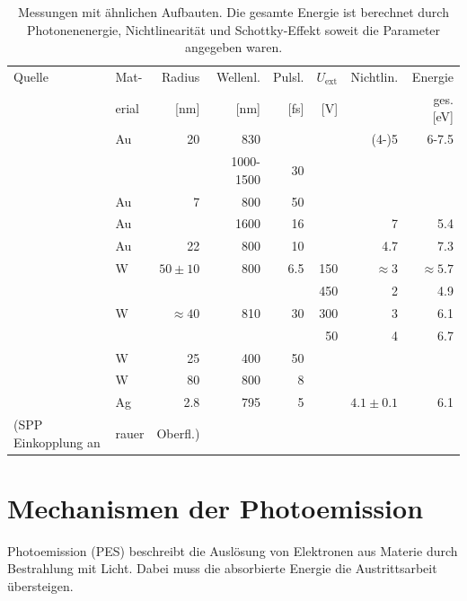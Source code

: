 \documentclass[bachelor,       %
               twoside,        %
               BCOR10mm,       %
               english,ngerman, %
               ]{GAUBM}
\begin{document}
\begin{table}[h]
	\centering
	\begin{tabular}{|l|l|r|r|r|r|r||r|}
\hline	Quelle 	& Mat- & Radius & Wellenl. & Pulsl. & $U_\text{ext}$ & Nichtlin. & Energie\\
& erial & [nm] & [nm] & [fs] & [V] & & ges. [eV]\\\hline\hline

	\cite{bormann_2010} & Au   & 20		 & 830 			&	 & 	& (4-)5 & 6-7.5 \\\hline
	\cite{park_2012} & & & 1000-1500 & 30 & & & \\\hline
	\cite{wimmer_2014} & Au & 7 & 800 & 50 & & & \\\hline
	\cite{vogelsang_2015} & Au & & 1600 & 16 & & 7 & 5.4\\\hline
	\cite{benni_15} & Au & 22 & 800 & 10 & & 4.7 & 7.3\\\hline
	\cite{schenk_2010} & W & $50\pm10$ & 800 & 6.5 & 150 & $\approx 3$ & $\approx 5.7$\\\hline
				& & & & & 450 & 2 & 4.9\\
	\cite{barwick_2007} & W & $\approx 40$ & 810 & 30 & 300 & 3 & 6.1 \\
				& & & & & 50 & 4 & 6.7\\\hline
	\cite{bormann_ea_2015} & W & 25 & 400 & 50 & & & \\\hline
	\cite{hommelhoff_2006} & W & 80 & 800 & 8 & & & \\\hline
	\cite{dombi_2010} & Ag & 2.8 & 795 & 5 & & $4.1\pm 0.1$ & 6.1\\
	(SPP Einkopplung an & rauer & Oberfl.) & & & & &\\\hline
	\end{tabular}
	\caption{Messungen mit ähnlichen Aufbauten. Die gesamte Energie ist berechnet durch Photonenenergie, Nichtlinearität und Schottky-Effekt soweit die Parameter angegeben waren.}
	\label{tab:tip_andere_gruppen}
\end{table}



\section{Mechanismen der Photoemission}
Photoemission (PES) beschreibt die Auslösung von Elektronen aus Materie durch Bestrahlung mit Licht.
Dabei muss die absorbierte Energie die Austrittsarbeit übersteigen.
\end{document}
